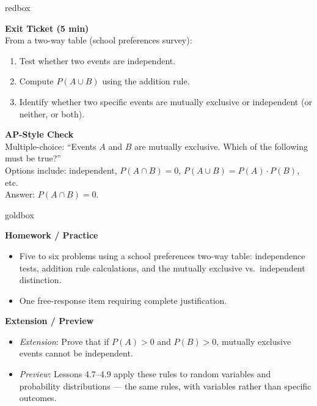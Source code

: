 \documentclass[10pt]{article}
\begin{document}
\begin{skillbox}{redbox}
\begin{minipage}[t]{0.48\linewidth}
    \textbf{Exit Ticket (5 min)}\\
    From a two-way table (school preferences survey):
    \begin{enumerate}
        \item Test whether two events are independent.
        \item Compute $P(A \cup B)$ using the addition rule.
        \item Identify whether two specific events are mutually exclusive
              or independent (or neither, or both).
    \end{enumerate}
\end{minipage}
\hfill
\begin{minipage}[t]{0.48\linewidth}
    \textbf{AP-Style Check}\\
    Multiple-choice: ``Events $A$ and $B$ are mutually exclusive. Which of the
    following must be true?''\\
    Options include: independent, $P(A \cap B) = 0$, $P(A \cup B) = P(A) \cdot P(B)$, etc.\\[4pt]
    Answer: $P(A \cap B) = 0$.
\end{minipage}
\end{skillbox}

\begin{skillbox}{goldbox}
\begin{minipage}[t]{0.48\linewidth}
    \textbf{Homework / Practice}
    \begin{itemize}
        \item Five to six problems using a school preferences two-way table:
              independence tests, addition rule calculations, and the
              mutually exclusive vs.\ independent distinction.
        \item One free-response item requiring complete justification.
    \end{itemize}
\end{minipage}
\hfill
\begin{minipage}[t]{0.48\linewidth}
    \textbf{Extension / Preview}
    \begin{itemize}
        \item \textit{Extension}: Prove that if $P(A) > 0$ and $P(B) > 0$,
              mutually exclusive events cannot be independent.
        \item \textit{Preview}: Lessons 4.7--4.9 apply these rules to random
              variables and probability distributions --- the same rules, with
              variables rather than specific outcomes.
    \end{itemize}
\end{minipage}
\end{skillbox}
\end{document}
